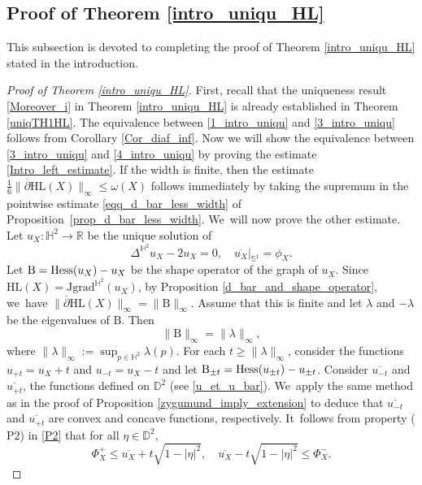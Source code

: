 \documentclass[11pt]{article}
\makeatletter
\DeclareRobustCommand{\mathbbm}[1]{\csname jepbb@#1\endcsname}
\theoremstyle{plain}
\theoremstyle{definition}
\newcommand{\grad}{\mathrm{grad}^{\mathbb{H}^2}}
\newcommand{\J}{\mathrm{J}}
\newcommand{\B}{\mathrm{B}}
\makeatother
\begin{document}
\subsection{Proof of Theorem \ref{intro_uniqu_HL}}
This subsection is devoted to completing the proof of Theorem \ref{intro_uniqu_HL} stated in the introduction.
\begin{proof}[Proof of Theorem \ref{intro_uniqu_HL}]
First, recall that the uniqueness result \eqref{Moreover_i} in Theorem \ref{intro_uniqu_HL} is already established in Theorem \ref{uniqTH1HL}.
The equivalence between \eqref{1_intro_uniqu} and \eqref{3_intro_uniqu} follows from Corollary \ref{Cor_diaf_inf}. Now we will show the equivalence between \eqref{3_intro_uniqu} and \eqref{4_intro_uniqu} by proving the estimate \eqref{Intro_left_estimate}.
If the width is finite, then the estimate \(\frac{1}{6} \lVert \overline{\partial} \mathrm{HL}(X) \rVert_{\infty} \leq \omega(X)\) follows immediately by taking the supremum in the pointwise estimate \eqref{eqq_d_bar_less_width} of Proposition~\ref{prop_d_bar_less_width}. We~will now prove the other estimate. Let \(u_X:\mathbb{H}^2 \to \mathbb{R}\) be the unique solution of
\begin{equation}\label{platau_HPXX}
\Delta^{\mathbb{H}^2} u_X - 2u_X = 0, \quad
\overline{u_X}|_{\mathbb{S}^1} = \phi_X.
\end{equation}
Let \(\B = \mathrm{Hess}(u_X) - u_X \mathbbm{1}\) be the shape operator of the graph of \(u_X\). Since \(\mathrm{HL}(X) = \J\grad(u_X)\), by Proposition \ref{d_bar_and_shape_operator}, we~have \(\lVert \overline{\partial} \mathrm{HL}(X) \rVert_{\infty} = \lVert \B \rVert_{\infty}\). Assume that this is finite and let \(\lambda\) and \(-\lambda\) be the eigenvalues of $\B$. Then
\[
\lVert \B \rVert_{\infty} = \lVert \lambda \rVert_{\infty},
\]
where \(\lVert \lambda \rVert_{\infty} := \sup_{p \in \mathbb{H}^2} \lambda(p).\)
For each \(t \geq \lVert \lambda \rVert_{\infty} \), consider the functions \(u_{+t} = u_X + t \) and \(u_{-t} = u_X - t \) and let \(\B_{\pm t} = \mathrm{Hess}(u_{\pm t}) - u_{\pm t} \mathbbm{1} \). Consider \(\overline{u_{-t}} \) and \(\overline{u_{+t}} \), the functions defined on \(\mathbb{D}^2\) (see \eqref{u_et_u_bar}). We~apply the same method as in the proof of Proposition \ref{zygumund_imply_extension} to deduce that \(\overline{u_{-t}}\) and \(\overline{u_{+t}}\) are convex and concave functions, respectively. It~follows from property ($\mathrm{P2}$) in \ref{P2} that for all \(\eta \in \mathbb{D}^2 \),
\[
\Phi_X^+ \leq \overline{u_X} + t \sqrt{1 - \lvert \eta \rvert^2}, \quad \overline{u_X} - t \sqrt{1 - \lvert \eta \rvert^2} \leq \Phi_X^-.
\]
\end{proof}
\end{document}
